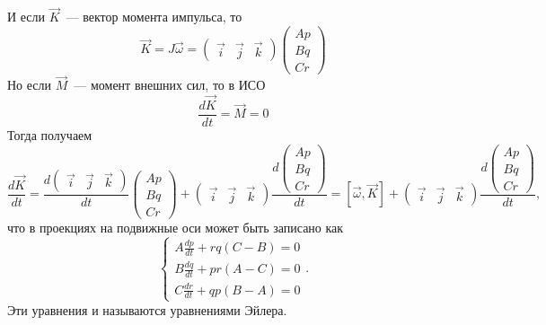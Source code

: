 \documentclass{article}
\begin{document}
И если \begin{math} \vec{K} \end{math}~--- вектор момента импульса, то
\begin{equation}
\vec{K}=J\vec{\omega}=
\left( \begin{array}{lcr} \vec{i} & \vec{j} & \vec{k} \end{array} \right)
\left( \begin{array}{lcr} A p\\B q\\C r \end{array} \right)
\end{equation}
Но если \begin{math} \vec{M} \end{math}~--- момент внешних сил, то в ИСО
\begin{equation}
\frac{d\vec{K}}{dt}=\vec{M}=0
\end{equation}
Тогда получаем
\begin{equation}
\frac{d\vec{K}}{dt}=
\frac{d\left( \begin{array}{lcr} \vec{i} & \vec{j} & \vec{k} \end{array} \right)}{dt}\left( \begin{array}{lcr} A p\\B q\\C r \end{array} \right)+
\left( \begin{array}{lcr} \vec{i} & \vec{j} & \vec{k} \end{array} \right)\frac{d\left( \begin{array}{lcr} A p\\B q\\C r \end{array} \right)}{dt}=
[\vec{\omega}, \vec{K}] + \left( \begin{array}{lcr} \vec{i} & \vec{j} & \vec{k} \end{array} \right)\frac{d\left( \begin{array}{lcr} A p\\B q\\C r \end{array} \right)}{dt},
\end{equation}
что в проекциях на подвижные оси может быть записано как
% 
\begin{equation}
\label{EulerEquations}
\left\{
\begin{array}{c}
A\frac{dp}{dt}+rq(C-B)=0\\
B\frac{dq}{dt}+pr(A-C)=0\\
C\frac{dr}{dt}+qp(B-A)=0
\end{array}
\right.
.
\end{equation}
Эти уравнения и называются уравнениями Эйлера.
\end{document}
